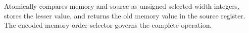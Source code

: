Atomically compares memory and source as unsigned selected-width integers, stores the lesser value, and returns the
old memory value in the source register. The encoded memory-order selector governs the complete operation.
